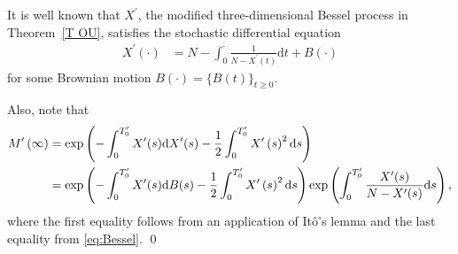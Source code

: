 \begin{remark}
It is well known that $X^{\prime }$, the modified three-dimensional Bessel
process in Theorem~\ref{T OU}, satisfies the stochastic differential
equation
\begin{align}  \label{eq:Bessel}
X^{\prime }( \cdot) &=N-\int_0^\cdot \frac{1}{N-X^{\prime }( t) } \mathrm{d}
t+ B(\cdot)
\end{align}%
for some Brownian motion $B(\cdot) = \{B(t)\}_{t \geq 0}$.

Also, note that
\begin{align*}
M^{\prime }\left( \infty \right) &=\exp \left( -\int_0^{T_0^{\prime }}
X^{\prime }(s) \mathrm{d} X^{\prime }(s) - \frac{1}{2}\int_{0}^{T_{0}^{%
\prime }}X^{\prime }\left( s\right) ^{2}\mathrm{d}s\right) \\
&= \exp \left( -\int_0^{T_0^{\prime }} X^{\prime }(s) \mathrm{d} B(s) -
\frac{1}{2}\int_{0}^{T_{0}^{\prime }}X^{\prime }\left( s\right) ^{2}\mathrm{d%
}s\right) \exp\left(\int_0^{T_0^{\prime }} \frac{X^{\prime }(s)}{N-
X^{\prime }(s)} \mathrm{d} s\right),
\end{align*}
where the first equality follows from an application of It\^o's lemma and
the last equality from \eqref{eq:Bessel}. \qed
\end{remark}

